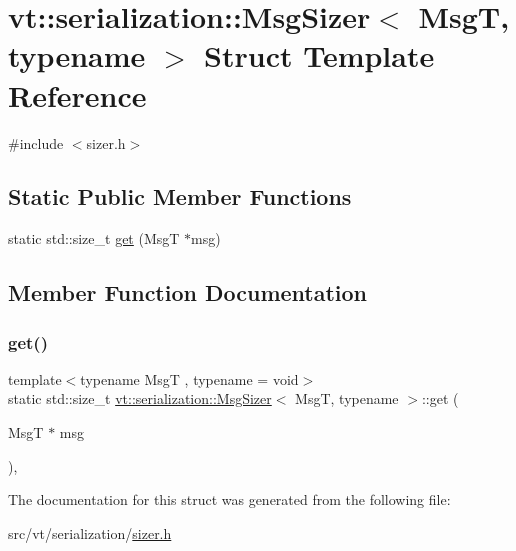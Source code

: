 \hypertarget{structvt_1_1serialization_1_1_msg_sizer}{}\section{vt\+:\+:serialization\+:\+:Msg\+Sizer$<$ MsgT, typename $>$ Struct Template Reference}
\label{structvt_1_1serialization_1_1_msg_sizer}


{\ttfamily \#include $<$sizer.\+h$>$}

\subsection*{Static Public Member Functions}
\begin{DoxyCompactItemize}
\item 
static std\+::size\+\_\+t \hyperlink{structvt_1_1serialization_1_1_msg_sizer_a22f440a462f8874a6661cb900d8d1d38}{get} (MsgT $\ast$msg)
\end{DoxyCompactItemize}


\subsection{Member Function Documentation}
\mbox{\label{structvt_1_1serialization_1_1_msg_sizer_a22f440a462f8874a6661cb900d8d1d38}} 
\subsubsection{\texorpdfstring{get()}{get()}}
{\footnotesize\ttfamily template$<$typename MsgT , typename  = void$>$ \\
static std\+::size\+\_\+t \hyperlink{structvt_1_1serialization_1_1_msg_sizer}{vt\+::serialization\+::\+Msg\+Sizer}$<$ MsgT, typename $>$\+::get (\begin{DoxyParamCaption}\item[{MsgT $\ast$}]{msg }\end{DoxyParamCaption})\hspace{0.3cm}{\ttfamily [inline]}, {\ttfamily [static]}}



The documentation for this struct was generated from the following file\+:\begin{DoxyCompactItemize}
\item 
src/vt/serialization/\hyperlink{src_2vt_2serialization_2sizer_8h}{sizer.\+h}\end{DoxyCompactItemize}

